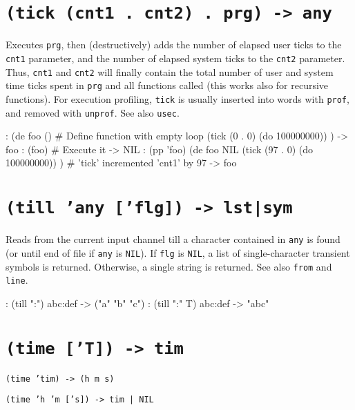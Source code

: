 { 
\section*{\texttt{(tick (cnt1 . cnt2) . prg) -> any}}
\label{sec:func-ref-T-(tick (cnt1 . cnt2) . prg) -> any}


Executes \texttt{prg}, then (destructively) adds the number of elapsed user
ticks to the \texttt{cnt1} parameter, and the number of elapsed system ticks to
the \texttt{cnt2} parameter. Thus, \texttt{cnt1} and \texttt{cnt2} will finally contain the
total number of user and system time ticks spent in \texttt{prg} and all
functions called (this works also for recursive functions). For
execution profiling, \texttt{tick} is usually inserted into words with \texttt{prof},
and removed with \texttt{unprof}. See also \texttt{usec}.


\begin{wideverbatim}
: (de foo ()                        # Define function with empty loop
   (tick (0 . 0) (do 100000000)) )
-> foo
: (foo)                             # Execute it
-> NIL
: (pp 'foo)
(de foo NIL
   (tick (97 . 0) (do 100000000)) ) # 'tick' incremented 'cnt1' by 97
-> foo
\end{wideverbatim}

 
\section*{\texttt{(till 'any ['flg]) -> lst|sym}}
\label{sec:func-ref-T-(till 'any ['flg]) -> lst|sym}


Reads from the current input channel till a character contained in \texttt{any}
is found (or until end of file if \texttt{any} is \texttt{NIL}). If \texttt{flg} is \texttt{NIL}, a
list of single-character transient symbols is returned. Otherwise, a
single string is returned. See also \texttt{from} and \texttt{line}.


\begin{wideverbatim}
: (till ":")
abc:def
-> ("a" "b" "c")
: (till ":" T)
abc:def
-> "abc"
\end{wideverbatim}

 
\section*{\texttt{(time ['T]) -> tim}}
\label{sec:func-ref-T-(time ['T]) -> tim}


\texttt{(time 'tim) -> (h m s)}

\texttt{(time 'h 'm ['s]) -> tim | NIL}

}

